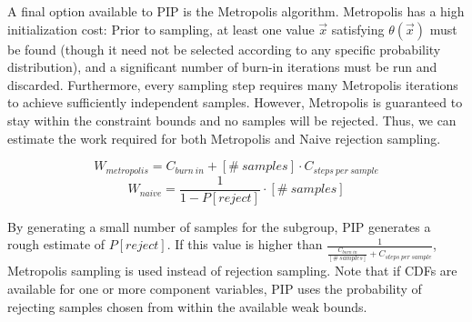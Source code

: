 A final option available to PIP is the Metropolis algorithm.  Metropolis has a high initialization cost: Prior to sampling, at least one value $\vec x$ satisfying $\theta(\vec x)$ must be found (though it need not be selected according to any specific probability distribution), and a significant number of burn-in iterations must be run and discarded.  Furthermore, every sampling step requires many Metropolis iterations to achieve sufficiently independent samples.  However, Metropolis is guaranteed to stay within the constraint bounds and no samples will be rejected.  Thus, we can estimate the work required for both Metropolis and Naive rejection sampling.

$$W_{metropolis} = C_{burn\ in} + [\#\ samples] \cdot C_{steps\ per\ sample}$$
$$W_{naive} = \frac{1}{1-P[reject]} \cdot [\#\ samples]$$

By generating a small number of samples for the subgroup, PIP generates a rough estimate of $P[reject]$.  If this value is higher than $\frac{1}{\frac{C_{burn\ in}}{[\#\ samples]} + C_{steps\ per\ sample}}$, Metropolis sampling is used instead of rejection sampling.  Note that if CDFs are available for one or more component variables, PIP uses the probability of rejecting samples chosen from within the available weak bounds.

